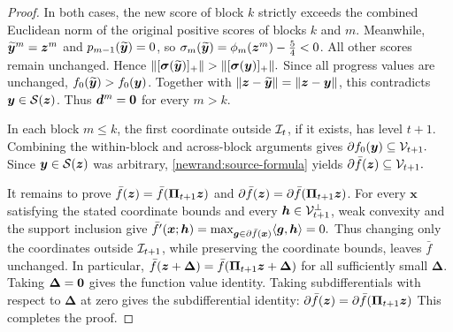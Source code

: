 \begin{proof}
In both cases, the new score of block $k$
strictly exceeds the combined Euclidean norm
of the original positive scores of blocks $k$
and $m$.
Meanwhile, $\widetilde{\bm{y}}^m=\bm{z}^m$ and
$p_{m-1}(\widetilde{\bm{y}})=0$, so
$\sigma_m(\widetilde{\bm{y}})=\phi_m(\bm{z}^m)-\tfrac54<0$.
All other scores remain unchanged. Hence
$
 \|[\boldsymbol\sigma(\widetilde{\bm{y}})]_+\|
 >
 \|[\boldsymbol\sigma(\bm{y})]_+\|.
$ 
Since all progress values are unchanged,
$f_0(\widetilde{\bm{y}})>f_0(\bm{y})$.
Together with $\|\bm{z}-\widetilde{\bm{y}}\|=\|\bm{z}-\bm{y}\|$,
this contradicts $\bm{y}\in\mathcal S(\bm{z})$.
Thus $\bm d^m={\mathbf 0}$ for every $m>k$.

In each block $m\le k$, the first coordinate
outside ${\cal I}_t$, if it exists, has level $t+1$.
Combining the within-block and across-block
arguments gives $ \partial f_0(\bm{y})\subseteq{\cal V}_{t+1}.
$ Since $\bm{y}\in\mathcal S(\bm{z})$ was arbitrary,
\eqref{newrand:source-formula} yields
$
 \partial \bar f(\bm{z})\subseteq{\cal V}_{t+1}.
$ 


It remains to prove
$\bar f(\bm{z})=\bar f(\mathbf{\Pi}_{t+1}\bm{z})$ and
$\partial \bar f(\bm{z})=\partial \bar f(\mathbf{\Pi}_{t+1}\bm{z})$. For every $\bm x$ satisfying the stated coordinate
bounds and every $\bm h\in{\cal V}_{t+1}^{\perp}$,
weak convexity and the support inclusion give
$ \bar f'(\bm x;\bm h)
 =
 \max_{\bm{g}\in\partial \bar f(\bm x)}
 \langle\bm{g},\bm h\rangle
 =0.
$  
Thus changing only the coordinates outside
${\cal I}_{t+1}$, while preserving the coordinate bounds,
leaves $\bar f$ unchanged. In particular, $ \bar f(\bm{z}+\bm \Delta )=\bar f(\mathbf{\Pi}_{t+1}\bm{z}+\bm \Delta )$ for all sufficiently small $\bm \Delta .$
Taking $\bm \Delta ={\mathbf 0}$ gives the function value identity.
Taking subdifferentials with respect to $\bm \Delta $
at zero gives the subdifferential identity: $\partial \bar f(\bm{z})=\partial \bar f(\mathbf{\Pi}_{t+1}\bm{z})$
This completes the proof.
\end{proof}
